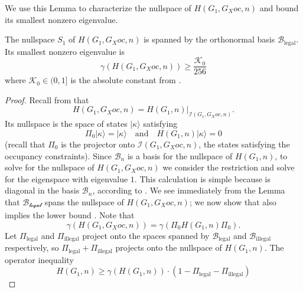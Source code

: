 \documentclass[../thesis-main/thesis-main]{subfiles}
\begin{document}
We use this Lemma to characterize the nullspace of $H(G_{1},G_Xoc,n)$ and bound its smallest nonzero eigenvalue.

\begin{lemma}
\label{lem:H_Galpha_Gtilde}The nullspace $S_1$ of $H(G_{1},G_Xoc,n)$ is spanned by the orthonormal basis $\mathcal{B}_{\text{legal}}$. Its smallest nonzero eigenvalue is
\begin{equation}
  \gamma(H(G_{1},G_Xoc,n)) \geq \frac{\mathcal{K}_0}{256} \label{eq:G_alpha_lowerbnd}
\end{equation}
where $\mathcal{K}_0\in (0,1]$ is the absolute constant from .
\end{lemma}

\begin{proof}
Recall from  that 
\begin{equation}
H(G_{1},G_Xoc,n)=H(G_{1},n)|_{\mathcal{I}(G_{1},G_Xoc,n)}.
\end{equation}
Its nullspace is the space of states $|\kappa\rangle$ satisfying
\begin{equation}
\Pi_{0}|\kappa\rangle=|\kappa\rangle\quad\text{and}\quad H(G_{1},n)|\kappa\rangle=0
\end{equation}
(recall that $\Pi_{0}$ is the projector onto $\mathcal{I}(G_{1},G_Xoc,n)$, the states satisfying the occupancy constraints). Since $\mathcal{B}_{n}$ is a basis for the nullspace of $H(G_{1},n)$, to solve for the nullspace of $H(G_{1},G_Xoc,n)$ we consider the restriction  and solve for the eigenspace with eigenvalue $1$. This calculation is simple because  is diagonal in the basis $\mathcal{B}_{n}$, according to . We see immediately from the Lemma that $\mathcal{\mathcal{B}_{\text{legal}}}$ spans the nullspace of $H(G_{1},G_Xoc,n)$; we now show that  also implies the lower bound . Note that
\begin{equation}
\gamma(H(G_{1},G_Xoc,n))=\gamma(\Pi_{0}H(G_{1},n)\Pi_{0}).
\end{equation}
Let $\Pi_{\text{legal}}$ and $\Pi_{\text{illegal}}$ project onto the spaces spanned by $\mathcal{B}_{\text{legal}}$ and $\mathcal{B}_{\text{illegal}}$ respectively, so $\Pi_{\text{legal}}+\Pi_{\text{illegal}}$ projects onto the nullspace of $H(G_{1},n)$. The operator inequality
\begin{equation}
H(G_{1},n)\geq\gamma(H(G_{1},n))\cdot\left(1-\Pi_{\text{legal}}-\Pi_{\text{illegal}}\right)
\end{equation}

\end{proof}
\end{document}
